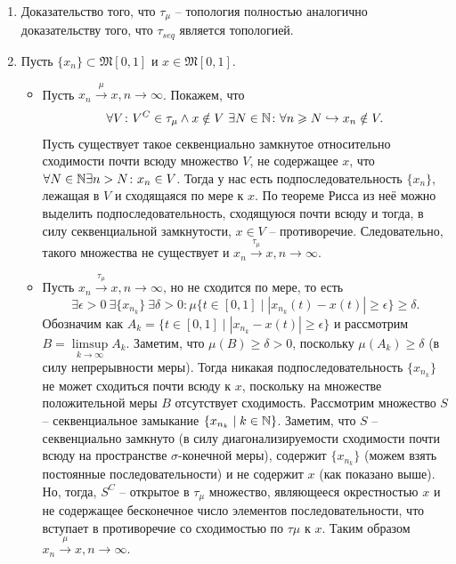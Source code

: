 \begin{solve}
    \begin{enumerate}
        \item Доказательство того, что $\tau_\mu$ -- топология полностью аналогично доказательству того, что $\tau_{seq}$ является топологией.
        \item Пусть $\{x_n\} \subset \mathfrak{M}[0, 1]$ и $x \in \mathfrak{M}[0, 1]$.
        \begin{itemize}
            \item Пусть $x_n \xrightarrow{\mu} x, n \rightarrow \infty$. Покажем, что
            \[
                \forall V\colon V^C \in \tau_\mu \wedge x \notin V \ \exists N \in \mathbb{N}\colon \forall n \geqslant N \hookrightarrow x_n \notin V.
            \]
            Пусть существует такое секвенциально замкнутое относительно сходимости почти всюду множество $V$, не содержащее $x$, что $\forall N \in \mathbb{N} \exists n > N\colon x_n \in V$. Тогда у нас есть подпоследовательность $\{x_n\}$, лежащая в $V$ и сходящаяся по мере к $x$. По теореме Рисса из неё можно выделить подпоследовательность, сходящуюся почти всюду и тогда, в силу секвенциальной замкнутости, $x \in V$ -- противоречие. Следовательно, такого множества не существует и $x_n \xrightarrow{\tau_\mu} x, n \rightarrow \infty$.
            \item Пусть $x_n \xrightarrow{\tau_\mu} x, n \rightarrow \infty$, но не сходится по мере, то есть
            \[
                \exists \epsilon > 0 \  \exists \{x_{n_k}\} \  \exists \delta > 0 \colon \mu\{t \in [0, 1] \mid |x_{n_k}(t) - x(t)| \geq \epsilon\} \geq \delta.
            \]
            Обозначим как $A_{k} = \{t \in [0, 1] \mid |x_{n_k} - x(t)| \geq \epsilon\}$ и рассмотрим $B = \limsup\limits_{k \rightarrow \infty} A_{k}$. Заметим, что $\mu(B) \geq \delta > 0$, поскольку $\mu(A_k) \geq \delta$ (в силу непрерывности меры). Тогда никакая подпоследовательность $\{x_{n_k}\}$ не может сходиться почти всюду к $x$, поскольку на множестве положительной меры $B$ отсутствует сходимость. Рассмотрим множество $S$ -- секвенциальное замыкание $\{x_{n_k} \mid k \in \mathbb{N}\}$. Заметим, что $S$ -- секвенциально замкнуто (в силу диагонализируемости сходимости почти всюду на пространстве $\sigma$-конечной меры), содержит $\{x_{n_k}\}$ (можем взять постоянные последовательности) и не содержит $x$ (как показано выше). Но, тогда, $S^C$ -- открытое в $\tau_\mu$ множество, являющееся окрестностью $x$ и не содержащее бесконечное число элементов последовательности, что вступает в противоречие со сходимостью по $\tau\mu$ к $x$. Таким образом $x_n \xrightarrow{\mu} x, n \rightarrow \infty$.
        \end{itemize}
    \end{enumerate}
\end{solve}
